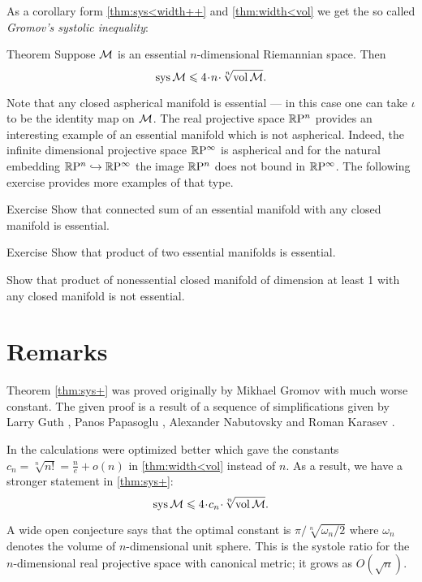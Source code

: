 As a corollary form \ref{thm:sys<width++} and \ref{thm:width<vol} we get the so called \emph{Gromov's systolic inequality}:

\begin{thm}{Theorem}\label{thm:sys+}
Suppose $\mathcal{M}$ is an essential $n$-dimensional Riemannian space.
Then 
\[\sys\spc{M}\le 4 \cdot n\cdot \sqrt[n]{\vol\spc{M}}.\]
\end{thm}


Note that any closed aspherical manifold is essential --- in this case one can take $\iota$ to be the identity map on $\mathcal{M}$.
The real projective space $\mathbb{R}\mathrm{P}^n$ provides an interesting example of an essential manifold which is not aspherical.
Indeed, the infinite dimensional projective space $\mathbb{R}\mathrm{P}^\infty$ is aspherical and for the natural embedding $\mathbb{R}\mathrm{P}^n\hookrightarrow\mathbb{R}\mathrm{P}^\infty$ the image $\mathbb{R}\mathrm{P}^n$ does not bound in $\mathbb{R}\mathrm{P}^\infty$.
The following exercise provides more examples of that type.

\begin{thm}{Exercise}\label{ex:connected-sum-essential}
Show that connected sum of an essential manifold with any closed manifold is essential.
\end{thm}

\begin{thm}{Exercise}\label{ex:product-essential}
Show that product of two essential manifolds is essential.

Show that product of nonessential closed manifold of dimension at least 1 with any closed manifold is not essential.
\end{thm}

\section{Remarks}

Theorem \ref{thm:sys+} was proved originally by Mikhael Gromov \cite{gromov-1983} with much worse constant.
The given proof is a result of a sequence of simplifications given by Larry Guth \cite{guth},  Panos Papasoglu \cite{papasoglu}, Alexander Nabutovsky and Roman Karasev \cite{nabutovsky}.

In \cite{nabutovsky} the calculations were optimized better which gave the constants 
$c_n=\sqrt[n]{n!}= \tfrac ne+o(n)$ in \ref{thm:width<vol} instead of $n$.
As a result, we have a stronger statement in \ref{thm:sys+}:
\[\sys\spc{M}\le 4 \cdot c_n\cdot \sqrt[n]{\vol\spc{M}}.\]

A wide open conjecture says that the optimal constant is $\pi/\sqrt[n]{\omega_n/2}$ where $\omega_n$ denotes the volume of $n$-dimensional unit sphere.
This is the systole ratio for the $n$-dimensional real projective space with canonical metric; it  grows as $O(\sqrt n)$.


